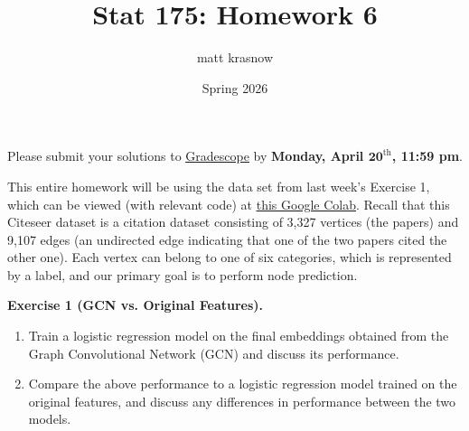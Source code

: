 \documentclass{article}
\title{\textbf{\textsf{Stat 175: Homework 6}}}
\author{\textsf{matt krasnow}}
\date{\textsf{Spring 2026}}
\begin{document}
\maketitle

Please submit your solutions to \href{https://www.gradescope.com/courses/1244242}{\underline{Gradescope}} by \textbf{Monday, April $\bm{20}^{\text{th}}$, 11:59 pm}.\newpar

This entire homework will be using the data set from last week's Exercise 1, which can be viewed (with relevant code) at \href{https://colab.research.google.com/drive/1g8hhp1txRcYINx_y6wXhQ1Sid27CfuWE#scrollTo=2pREw2UQuBH4}{\underline{this Google Colab}}. Recall that this Citeseer dataset is a citation dataset consisting of 3,327 vertices (the papers) and 9,107 edges (an undirected edge indicating that one of the two papers cited the other one). Each vertex can belong to one of six categories, which is represented by a label, and our primary goal is to perform node prediction.

\begin{tcolorbox}[colback = gray!16, enhanced, boxrule=0pt, frame hidden, sharp corners, borderline west={3pt}{-1.5pt}{black!80},breakable]
\textbf{Exercise 1 (GCN vs. Original Features).}

\begin{enumerate}[$(a)$]
    \item Train a logistic regression model on the final embeddings obtained from the Graph Convolutional Network (GCN) and discuss its performance.
    \item Compare the above performance to a logistic regression model trained on the original features, and discuss any differences in performance between the two models.
\end{enumerate}

\end{tcolorbox}
\end{document}
